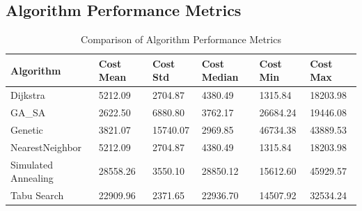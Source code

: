 \documentclass[
]{article}
\begin{document}
    \subsection{Algorithm Performance Metrics}

    \begin{table}[h!]
        \centering
        \caption{Comparison of Algorithm Performance Metrics}
        \label{tab:performance_metrics}
        \begin{tabularx}{\textwidth}{|l|X|X|X|X|X|}
            \hline
            \textbf{Algorithm}  & \textbf{Cost Mean} & \textbf{Cost Std} & \textbf{Cost Median} & \textbf{Cost Min} & \textbf{Cost Max} \\
            \hline
            Dijkstra            & 5212.09            & 2704.87           & 4380.49              & 1315.84           & 18203.98          \\
            GA\_SA              & 2622.50            & 6880.80           & 3762.17              & 26684.24          & 19446.08          \\
            Genetic             & 3821.07            & 15740.07          & 2969.85              & 46734.38          & 43889.53          \\
            NearestNeighbor     & 5212.09            & 2704.87           & 4380.49              & 1315.84           & 18203.98          \\
            Simulated Annealing & 28558.26           & 3550.10           & 28850.12             & 15612.60          & 45929.57          \\
            Tabu Search         & 22909.96           & 2371.65           & 22936.70             & 14507.92          & 32534.24          \\
            \hline
        \end{tabularx}

        \vspace{1em}


\end{table}
\end{document}
